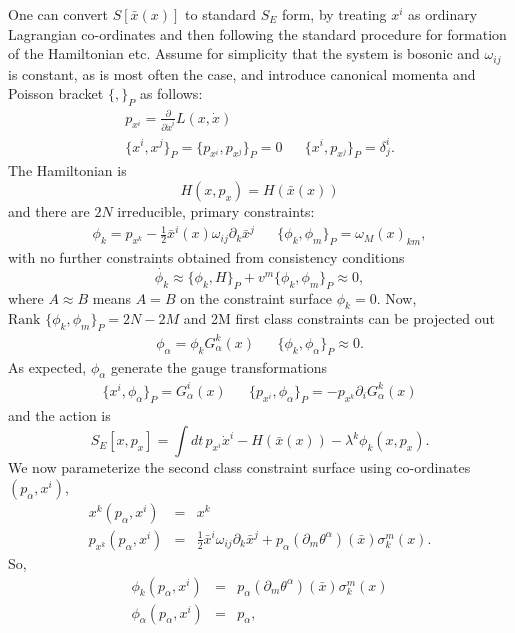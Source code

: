\documentclass[a4paper,12pt]{article}
\theoremstyle{definition}
\theoremstyle{remark}
\numberwithin{equation}{section}
\newcommand{\al}{\alpha}
\newcommand{\de}{\delta}
\newcommand{\la}{\lambda}
\newcommand{\om}{\omega}
\newcommand{\si}{\sigma}
\newcommand{\bx}{\bar{x}}
\newcommand{\dx}{\dot{x}}
\newcommand{\pa}{\partial}
\begin{document}
One can convert $S[\bx(x)]$ to standard $S_E$ form, by treating
$x^i$ as ordinary Lagrangian co-ordinates and then following the
standard procedure for formation of the Hamiltonian etc. Assume
for simplicity that the system is bosonic and $\om_{ij}$ is
constant, as is most often the case, and introduce canonical
momenta and Poisson bracket $\{,\}_P$ as follows:
\begin{eqnarray}
p_{x^i}=\frac{\pa}{\pa\dx^i}L(x,\dx) \\
\{x^i,x^j\}_P=\{p_{x^i},p_{x^j}\}_P=0 && \{x^i,p_{x^j}\}_P=\de^i_j.
\end{eqnarray}
The Hamiltonian is
\begin{equation}
H(x,p_x)=H(\bx(x))
\end{equation}
and there are $2N$ irreducible, primary constraints:
\begin{eqnarray}
\phi_k=p_{x^k}-\frac{1}{2}\bx^i(x)\om_{ij}\pa_k\bx^j &&
\{\phi_k,\phi_m\}_P=\om_M(x)_{km},
\end{eqnarray}
with no further constraints obtained from consistency conditions
\begin{equation}
\dot{\phi_k}\approx \{\phi_k,H\}_P + v^m\{\phi_k,\phi_m\}_P \approx
0,
\end{equation}
where $A\approx B$ means $A=B$ on the constraint surface
$\phi_k=0$. Now, $\text{Rank }\{\phi_k,\phi_m\}_P=2N-2M$ and 2M
first class constraints can be projected out
\begin{eqnarray}
\phi_{\al}=\phi_k G^k_{\al}(x) &&
\{\phi_k,\phi_{\al}\}_P \approx 0.
\end{eqnarray}
As expected, $\phi_{\al}$ generate the gauge transformations
\begin{eqnarray}
\{x^i,\phi_{\al}\}_P=G^i_{\al}(x) &&
\{p_{x^i},\phi_{\al}\}_P=-p_{x^k}\pa_iG^k_{\al}(x)
\end{eqnarray}
and the action is
\begin{equation}
S_E[x,p_x]=\int{dt\, p_{x^i}\dx^i-H(\bx(x))-\la^k \phi_k(x,p_x)}.
\end{equation}
We now parameterize the second class constraint surface using
co-ordinates $(p_\al,x^i)$,
\begin{eqnarray}
x^k(p_\al,x^i)&=& x^k\\
p_{x^k}(p_\al,x^i) &=& \frac{1}{2}\bx^i\om_{ij}\pa_k\bx^j +
p_{\al}(\pa_m \theta^{\al})(\bx) \si^m_k(x).
\end{eqnarray}
So,
\begin{eqnarray}
\phi_k(p_\al,x^i)&=& p_{\al}(\pa_m \theta^{\al})(\bx) \si^m_k(x)\\
\phi_\al(p_\al,x^i)&=& p_\al,
\end{eqnarray}
\end{document}
